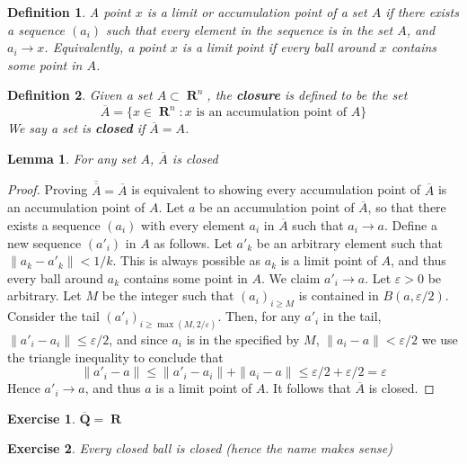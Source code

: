\documentclass{report}
\newtheorem{lemma}[theorem]{Lemma}
\newtheorem{definition}{Definition}
\newtheorem{exercise}{Exercise}
\DeclareMathOperator{\real}{\mathbf{R}}
\begin{document}
\begin{definition}
  A point $x$ is a limit or accumulation point of a set $A$ if there exists a sequence $(a_i)$ such that every element in the sequence is in the set $A$, and $a_i \to x$. Equivalently, a point $x$ is a limit point if every ball around $x$ contains some point in $A$.
\end{definition}

\begin{definition}
  Given a set $A \subset \real^n$, the {\bf closure} is defined to be the set
  \[ \overline{A} = \{ x \in \real^n : \text{$x$ is an accumulation point of $A$} \} \]
  We say a set is {\bf closed} if $\overline{A} = A$.
\end{definition}

\begin{lemma}
  For any set $A$, $\overline{A}$ is closed
\end{lemma}
\begin{proof}
  Proving $\overline{\overline{A}} = \overline{A}$ is equivalent to showing every accumulation point of $\overline{A}$ is an accumulation point of $A$. Let $a$ be an accumulation point of $\overline{A}$, so that there exists a sequence $(a_i)$ with every element $a_i$ in $\overline{A}$ such that $a_i \to a$. Define a new sequence $(a'_i)$ in $A$ as follows. Let $a'_k$ be an arbitrary element such that $\| a_k - a'_k \| < 1/k$. This is always possible as $a_k$ is a limit point of $A$, and thus every ball around $a_k$ contains some point in $A$. We claim $a'_i \to a$. Let $\varepsilon > 0$ be arbitrary. Let $M$ be the integer such that $(a_i)_{i \geq M}$ is contained in $B(a,\varepsilon/2)$. Consider the tail $(a'_i)_{i \geq \max(M,2/\varepsilon)}$. Then, for any $a'_i$ in the tail, $\| a'_i - a_i \| \leq \varepsilon/2$, and since $a_i$ is in the specified by $M$, $\| a_i - a \| < \varepsilon/2$ we use the triangle inequality to conclude that
  \[ \| a'_i - a \| \leq \| a'_i - a_i \| + \| a_i - a \| \leq \varepsilon/2 + \varepsilon/2 = \varepsilon \]
  Hence $a'_i \to a$, and thus $a$ is a limit point of $A$. It follows that $\overline{A}$ is closed.
\end{proof}

\begin{exercise}
  $\overline{\mathbf{Q}} = \real$
\end{exercise}

\begin{exercise}
  Every closed ball is closed (hence the name makes sense)
\end{exercise}
\end{document}
